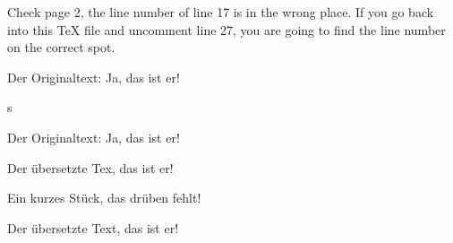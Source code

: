 \documentclass{book}
\begin{document}
Check page 2, the line number of line 17 is in the wrong place. If you go back into this \TeX{} file and uncomment line 27, you are going to find the line number on the correct spot.

\begin{pages}
\begin{Leftside}
\beginnumbering
{}

Der Originaltext: \blindtext[2] Ja, das ist er!
\pend

\pstart
s\skipnumbering
\pend


Der Originaltext: \blindtext[2] Ja, das ist er!
\pend
\endnumbering   
\end{Leftside}

\begin{Rightside}
\beginnumbering
{}

Der übersetzte Tex, das ist er! \blindtext[3]
\pend

\pstart
Ein kurzes Stück, das drüben fehlt!
\pend


Der übersetzte Text, das ist er! \blindtext[2]
\pend
\endnumbering
\end{Rightside}
\end{pages}
\Pages
\end{document}
